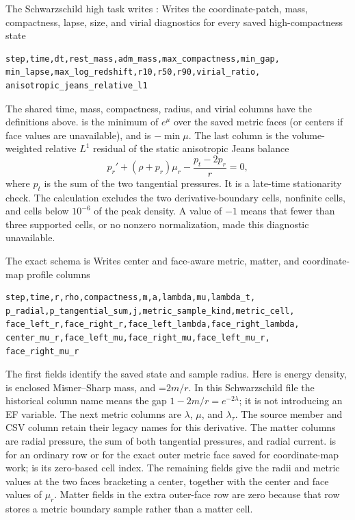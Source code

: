 The Schwarzschild high task writes :
{}
{Writes the coordinate-patch, mass, compactness, lapse, size, and virial
 diagnostics for every saved high-compactness state}
\begin{lstlisting}[basicstyle=\ttfamily\scriptsize]
step,time,dt,rest_mass,adm_mass,max_compactness,min_gap,
min_lapse,max_log_redshift,r10,r50,r90,virial_ratio,
anisotropic_jeans_relative_l1
\end{lstlisting}
The shared time, mass, compactness, radius, and virial columns have the
definitions above.   is the minimum of \(e^\mu\) over the
saved metric faces (or centers if face values are unavailable), and
 is \(-\min\mu\).  The last column is the
volume-weighted relative \(L^1\) residual of the static anisotropic Jeans
balance
\[
 p_r'+(\rho+p_r)\mu_r-\frac{p_t-2p_r}{r}=0,
\]
where \(p_t\) is the sum of the two tangential pressures.  It is a late-time
stationarity check.  The calculation excludes the two derivative-boundary
cells, nonfinite cells, and cells below \(10^{-6}\) of the peak density.  A
value of \(-1\) means that fewer than three supported cells, or no nonzero
normalization, made this diagnostic unavailable.

The exact  schema is
{}
{Writes center and face-aware metric, matter, and coordinate-map profile
 columns}
\begin{lstlisting}[basicstyle=\ttfamily\scriptsize]
step,time,r,rho,compactness,m,a,lambda,mu,lambda_t,
p_radial,p_tangential_sum,j,metric_sample_kind,metric_cell,
face_left_r,face_right_r,face_left_lambda,face_right_lambda,
center_mu_r,face_left_mu,face_right_mu,face_left_mu_r,
face_right_mu_r
\end{lstlisting}
The first fields identify the saved state and sample radius.  Here 
is energy density,  is enclosed Misner--Sharp mass, and
=\(2m/r\).  In this Schwarzschild file the historical column
name  means the gap \(1-2m/r=e^{-2\lambda}\); it is not introducing an
EF variable.  The next metric columns are \(\lambda\), \(\mu\), and
\(\lambda_\tau\).  The source member and CSV column 
retain their legacy names for this derivative.  The matter columns are
radial pressure, the sum of both
tangential pressures, and radial current.   is
 for an ordinary row or  for the exact outer
metric face saved for coordinate-map work;  is its zero-based
cell index.  The remaining fields give the radii and metric values at the two
faces bracketing a center, together with the center and face values of
\(\mu_r\).  Matter fields in the extra outer-face row are zero because that row
stores a metric boundary sample rather than a matter cell.

